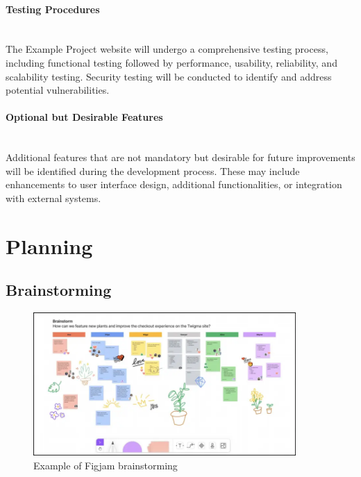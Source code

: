 \documentclass[12pt,a4paper]{article}
\begin{document}
\begin{spacing}{1.5}
    \paragraph{Testing Procedures} \mbox{} \\ \indent
    The Example Project website will undergo a comprehensive testing process, including functional testing followed by performance, usability, reliability, and scalability testing. Security testing will be conducted to identify and address potential vulnerabilities.

    \paragraph{Optional but Desirable Features} \mbox{} \\ \indent
    Additional features that are not mandatory but desirable for future improvements will be identified during the development process. These may include enhancements to user interface design, additional functionalities, or integration with external systems.

    \newpage
    \section{Planning}
    \subsection{Brainstorming}
    \begin{figure}[h]
        \centering
        \includegraphics[width=10cm]{assets/brainstorming-example.png}
        \caption{Example of Figjam brainstorming}
        \label{fig:figjam-brainstorming}
    \end{figure}
    \FloatBarrier


\end{spacing}
\end{document}
